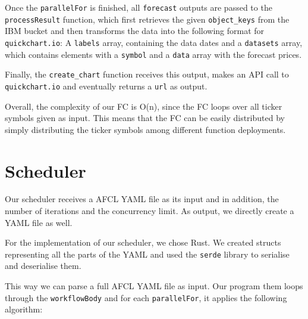 Once the \texttt{parallelFor} is finished, all \texttt{forecast} outputs are passed
to the \texttt{processResult} function, which first retrieves the given \texttt{object\_keys}
from the IBM bucket and then transforms the data into the following format for
\texttt{quickchart.io}: A \texttt{labels} array, containing the data dates and a
\texttt{datasets} array, which contains elements with a \texttt{symbol} and a
\texttt{data} array with the forecast prices.

Finally, the \texttt{create\_chart} function receives this output, makes an API
call to \texttt{quickchart.io} and eventually returns a \texttt{url} as output.

Overall, the complexity of our FC is O(n), since the FC loops over all ticker symbols
given as input. This means that the FC can be easily distributed by simply distributing
the ticker symbols among different function deployments.



%
%
%
\section{Scheduler}

Our scheduler receives a AFCL YAML file as its input and in addition, the number of iterations and the concurrency limit.
As output, we directly create a YAML file as well.

For the implementation of our scheduler, we chose Rust. We created structs representing all the parts of the YAML and
used the \texttt{serde} library to serialise and deserialise them.

This way we can parse a full AFCL YAML file as input. Our program them loops through the \texttt{workflowBody} and
for each \texttt{parallelFor}, it applies the following algorithm:

